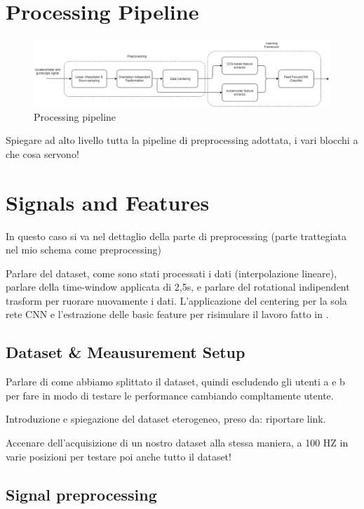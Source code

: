 
\section{Processing Pipeline}
\label{sec:processing_architecture}

\begin{figure}[h]
	\centering
	\includegraphics[width=1\textwidth]{images/processing_pipeline.jpg}
	\caption{Processing pipeline}
\end{figure}

Spiegare ad alto livello tutta la pipeline di preprocessing adottata, i vari blocchi a che cosa servono!

\section{Signals and Features}
\label{sec:model}

In questo caso si va nel dettaglio della parte di preprocessing (parte trattegiata nel mio schema come preprocessing)

Parlare del dataset, come sono stati processati i dati (interpolazione lineare), parlare della time-window applicata di 2,5s, e parlare del rotational indipendent trasform per ruorare nuovamente i dati. L'applicazione del centering per la sola rete CNN e l'estrazione delle basic feature per risimulare il lavoro fatto in \cite{ignatov2018real}.

\subsection{Dataset \& Meausurement Setup}
Parlare di come abbiamo splittato il dataset, quindi escludendo gli utenti a e b per fare in modo di testare le performance cambiando compltamente utente.

Introduzione e spiegazione del dataset eterogeneo, preso da: riportare link.

Accenare dell'acquisizione di un nostro dataset alla stessa maniera, a 100 HZ in varie posizioni per testare poi anche tutto il dataset!

\subsection{Signal preprocessing}

